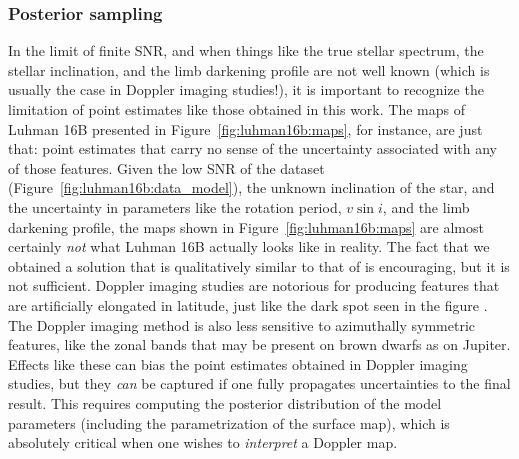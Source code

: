 \documentclass[modern]{aastex631}
\begin{document}
\subsubsection{Posterior sampling}
\label{sec:discussion:priors:mcmc}
%
In the limit of finite SNR, and when things like the true stellar spectrum, the stellar inclination, and the limb darkening profile are not well known (which is usually the case in Doppler imaging studies!), it is important to recognize the limitation of point estimates like those obtained in this work.
The maps of Luhman 16B presented in Figure~\ref{fig:luhman16b:maps}, for instance, are just that: point estimates that carry no sense of the uncertainty associated with any of those features.
Given the low SNR of the dataset (Figure~\ref{fig:luhman16b:data_model}), the unknown inclination of the star, and the uncertainty in parameters like the rotation period, $v\sin i$, and the limb darkening profile, the maps shown in Figure~\ref{fig:luhman16b:maps} are almost certainly \emph{not} what Luhman 16B actually looks like in reality.
The fact that we obtained a solution that is qualitatively similar to that of \citet{Crossfield2014} is encouraging, but it is not sufficient.
Doppler imaging studies are notorious for producing features that are artificially elongated in latitude, just like the dark spot seen in the figure \citep[see, e.g.,][]{Unruh1995}.
The Doppler imaging method is also less sensitive to azimuthally symmetric features, like the zonal bands that may be present on brown dwarfs as on Jupiter.
Effects like these can bias the point estimates obtained in Doppler imaging studies, but they \emph{can} be captured if one fully propagates uncertainties to the final result.
This requires computing the posterior distribution of the model parameters (including the parametrization of the surface map), which is absolutely critical when one wishes to \emph{interpret} a Doppler map.
\end{document}
